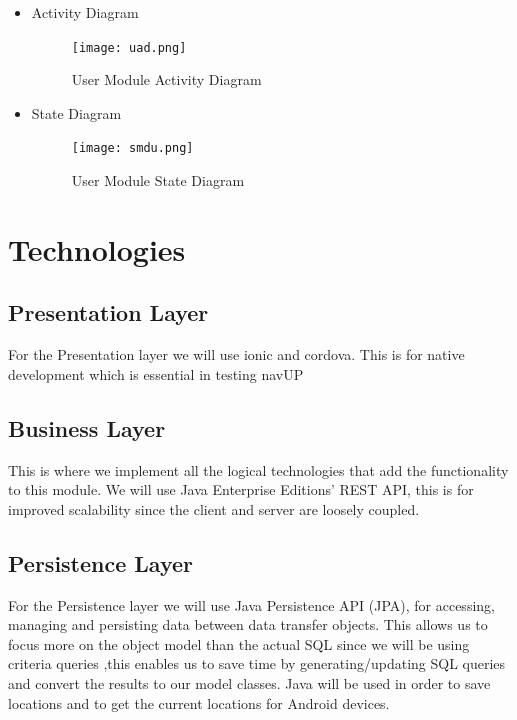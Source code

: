 \documentclass{article}
\begin{document}
\begin{itemize}
 				\item Activity Diagram
 				\begin{center}
 					\begin{figure}[!h]
 						\texttt{[image: uad.png]}
 						\caption{User Module Activity Diagram}
 					\end{figure}
 				\end{center}
 				\pagebreak
 				
				\item State Diagram
				\begin{center}
					\begin{figure}[!h]
						\texttt{[image: smdu.png]}
						\caption{User Module State Diagram}
					\end{figure}
				\end{center}
			
 		\end{itemize}


\section{Technologies}
		
		\subsection{Presentation Layer}
		For the Presentation layer we will use ionic and cordova. This is for native development which is essential in testing navUP
		
		\subsection{Business Layer}
		This is where we implement all the logical technologies that add the functionality to this module. We will use Java Enterprise Editions' REST API, this is for improved scalability since the client and server are loosely coupled.
		
		\subsection{Persistence Layer}
		For the Persistence layer we will use Java Persistence API (JPA), for accessing, managing and persisting data between data transfer objects. This allows us to focus more on the object model than the actual SQL since we will be using criteria queries ,this enables us to save time by generating/updating SQL queries and convert the results to our model classes.
		Java will be used in order to save locations and to get the current locations for Android devices.
		
\end{document}
